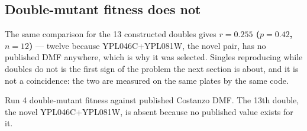 \subsection{Double-mutant fitness does not}

The same comparison for the 13 constructed doubles gives \textbf{$r=0.255$ ($p=0.42$,
$n=12$)} --- twelve because YPL046C+YPL081W, the novel pair, has no published DMF anywhere,
which is why it was selected. Singles reproducing while doubles do not is the first sign of
the problem the next section is about, and it is not a coincidence: the two are measured on
the same plates by the same code.

%
  {Run 4 double-mutant fitness against published Costanzo DMF. The 13th double, the novel
   YPL046C+YPL081W, is absent because no published value exists for it.}

